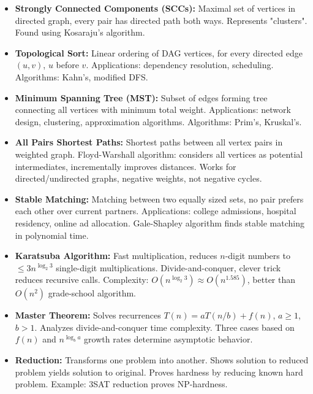 \documentclass[landscape,7pt]{extarticle}
\begin{document}
\begin{multicols*}{3}
\begin{itemize}
    \item \textbf{Strongly Connected Components (SCCs):} Maximal set of vertices in directed graph, every pair has directed path both ways. Represents "clusters". Found using Kosaraju's algorithm.
    \item \textbf{Topological Sort:} Linear ordering of DAG vertices, for every directed edge $(u,v)$, $u$ before $v$. Applications: dependency resolution, scheduling. Algorithms: Kahn's, modified DFS.
    \item \textbf{Minimum Spanning Tree (MST):} Subset of edges forming tree connecting all vertices with minimum total weight. Applications: network design, clustering, approximation algorithms. Algorithms: Prim's, Kruskal's.
    \item \textbf{All Pairs Shortest Paths:} Shortest paths between all vertex pairs in weighted graph. Floyd-Warshall algorithm: considers all vertices as potential intermediates, incrementally improves distances. Works for directed/undirected graphs, negative weights, not negative cycles.
    \item \textbf{Stable Matching:} Matching between two equally sized sets, no pair prefers each other over current partners. Applications: college admissions, hospital residency, online ad allocation. Gale-Shapley algorithm finds stable matching in polynomial time.
    \item \textbf{Karatsuba Algorithm:} Fast multiplication, reduces $n$-digit numbers to $\leq 3n^{\log_2 3}$ single-digit multiplications. Divide-and-conquer, clever trick reduces recursive calls. Complexity: $O(n^{\log_2 3}) \approx O(n^{1.585})$, better than $O(n^2)$ grade-school algorithm.
    \item \textbf{Master Theorem:} Solves recurrences $T(n) = aT(n/b) + f(n)$, $a \geq 1$, $b > 1$. Analyzes divide-and-conquer time complexity. Three cases based on $f(n)$ and $n^{\log_b a}$ growth rates determine asymptotic behavior.
    \item \textbf{Reduction:} Transforms one problem into another. Shows solution to reduced problem yields solution to original. Proves hardness by reducing known hard problem. Example: 3SAT reduction proves NP-hardness.
\end{itemize}

\end{multicols*}
\end{document}
